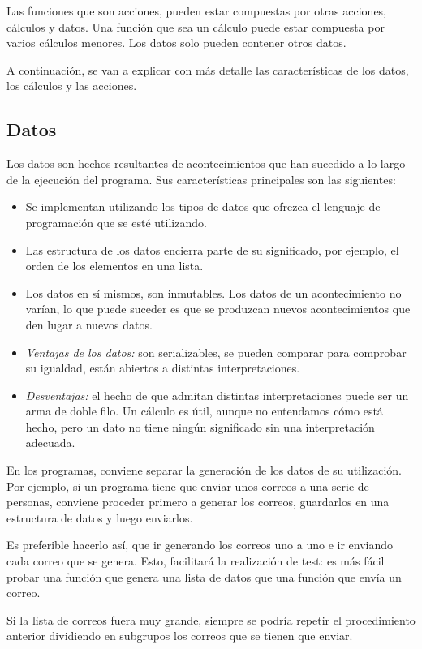 Las funciones que son acciones, pueden estar compuestas por otras acciones, cálculos y datos. Una función que sea un cálculo puede estar compuesta por varios cálculos menores. Los datos solo pueden contener otros datos.

A continuación, se van a explicar con más detalle las características de los datos, los cálculos y las 
acciones.

\subsection{Datos}
\noindent Los datos son hechos resultantes de acontecimientos que han sucedido a lo largo de la ejecución del programa. Sus características principales son las siguientes:
\begin{itemize}
   \item Se implementan utilizando los tipos de datos que ofrezca el lenguaje de programación que se esté utilizando.
   \item Las estructura de los datos encierra parte de su significado, por ejemplo, el orden de los elementos en una lista.
   \item Los datos en sí mismos, son inmutables. Los datos de un acontecimiento no varían, lo que puede suceder es que se produzcan nuevos acontecimientos que den lugar a nuevos datos.
   \item \textit{Ventajas de los datos:} son serializables, se pueden comparar para comprobar su igualdad, están abiertos a distintas interpretaciones.
   \item \textit{Desventajas:} el hecho de que admitan distintas interpretaciones puede ser un arma de doble filo. Un cálculo es útil, aunque no entendamos cómo está hecho, pero un dato no tiene ningún significado sin una interpretación adecuada.
\end{itemize}

En los programas, conviene separar la generación de los datos de su utilización. Por ejemplo, si un programa tiene que enviar unos correos a una serie de personas, conviene proceder primero a generar los correos, guardarlos en una estructura de datos y luego enviarlos. 

Es preferible hacerlo así, que ir generando los correos uno a uno e ir enviando cada correo que se genera. Esto, facilitará la realización de test: es más fácil probar una función que genera una lista de datos que una función que envía un correo.

Si la lista de correos fuera muy grande, siempre se podría repetir el procedimiento anterior dividiendo en subgrupos los correos que se tienen que enviar.

